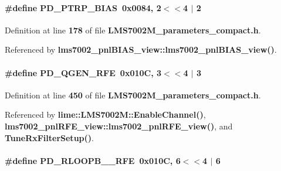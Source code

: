 \paragraph[{P\+D\+\_\+\+P\+T\+R\+P\+\_\+\+B\+I\+AS}]{\setlength{\rightskip}{0pt plus 5cm}\#define P\+D\+\_\+\+P\+T\+R\+P\+\_\+\+B\+I\+AS~0x0084, 2$<$$<$4 $\vert$  2}\label{LMS7002M__parameters__compact_8h_a7758b45ec14b8f396fd75f554d0227e2}


Definition at line {\bf 178} of file {\bf L\+M\+S7002\+M\+\_\+parameters\+\_\+compact.\+h}.



Referenced by {\bf lms7002\+\_\+pnl\+B\+I\+A\+S\+\_\+view\+::lms7002\+\_\+pnl\+B\+I\+A\+S\+\_\+view()}.

\paragraph[{P\+D\+\_\+\+Q\+G\+E\+N\+\_\+\+R\+FE}]{\setlength{\rightskip}{0pt plus 5cm}\#define P\+D\+\_\+\+Q\+G\+E\+N\+\_\+\+R\+FE~0x010\+C, 3$<$$<$4 $\vert$  3}\label{LMS7002M__parameters__compact_8h_a22a0692a8c59f78e633c98e7c9f0c68c}


Definition at line {\bf 450} of file {\bf L\+M\+S7002\+M\+\_\+parameters\+\_\+compact.\+h}.



Referenced by {\bf lime\+::\+L\+M\+S7002\+M\+::\+Enable\+Channel()}, {\bf lms7002\+\_\+pnl\+R\+F\+E\+\_\+view\+::lms7002\+\_\+pnl\+R\+F\+E\+\_\+view()}, and {\bf Tune\+Rx\+Filter\+Setup()}.

\paragraph[{P\+D\+\_\+\+R\+L\+O\+O\+P\+B\+\_\+1\+\_\+\+R\+FE}]{\setlength{\rightskip}{0pt plus 5cm}\#define P\+D\+\_\+\+R\+L\+O\+O\+P\+B\+\_\+\_\+\+R\+FE~0x010\+C, 6$<$$<$4 $\vert$  6}\label{LMS7002M__parameters__compact_8h_af84dd8337462f7acd4261eb5ddcc1f74}


